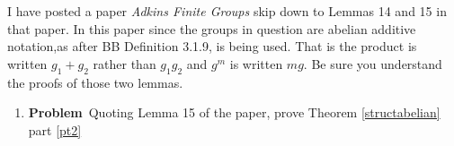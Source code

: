 \documentclass[12pt]{amsart}
\theoremstyle{definition}
\newcommand{\itep}{\item {\bfseries Problem}\ }
\begin{document}
 I have posted a paper {\em Adkins Finite Groups} skip down to Lemmas 14 and 15 in that paper. In this paper since the groups in question are abelian additive notation,as after BB Definition 3.1.9, is being used. That is the product is written $g_1+g_2$ rather than $g_1g_2$ and $g^m$ is written $mg$. Be sure you understand the proofs of those two lemmas.

\begin{enumerate}[resume=p]
\itep Quoting Lemma 15 of the paper, prove Theorem \ref{structabelian} part \ref{pt2}
\end{enumerate}
\end{document}
